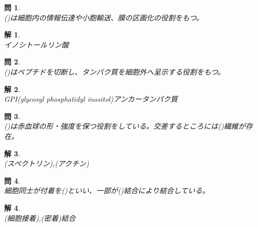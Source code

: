 \documentclass{jsarticle}
\newtheorem{pro}{問}[section]
\newtheorem{ans}{解}[section]
\begin{document}
\begin{pro}~\\
    (\hspace{5mm})は細胞内の情報伝達や小胞輸送、膜の区画化の役割をもつ。
\end{pro}
\begin{ans}~\\
    イノシトールリン酸
\end{ans}

\begin{pro}~\\
    (\hspace{5mm})はペプチドを切断し、タンパク質を細胞外へ呈示する役割をもつ。
\end{pro}
\begin{ans}~\\
    GPI(glycosyl phosphatidyl inositol)アンカータンパク質
\end{ans}

\begin{pro}~\\
    (\hspace{5mm})は赤血球の形・強度を保つ役割をしている。交差するところには(\hspace{5mm})繊維が存在。
\end{pro}
\begin{ans}~\\
    (スペクトリン),(アクチン)
\end{ans}

\begin{pro}~\\
    細胞同士が付着を(\hspace{5mm})といい、一部が(\hspace{5mm})結合により結合している。
\end{pro}
\begin{ans}~\\
    (細胞接着),(密着)結合
\end{ans}
\end{document}
